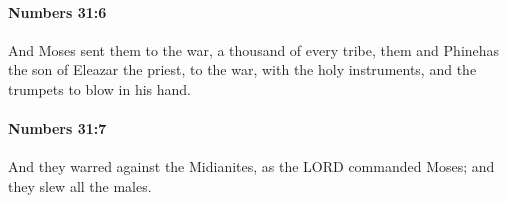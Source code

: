 		\paragraph{Numbers 31:6} %
			\label{NUMBERS-31-6}

			And Moses sent them to the war, a thousand of every tribe, them and Phinehas the son of Eleazar the priest, to the war, with the holy instruments, and the trumpets to blow in his hand.


		\paragraph{Numbers 31:7} %
			\label{NUMBERS-31-7}

			And they warred against the Midianites, as the LORD commanded Moses; and they slew all the males.


